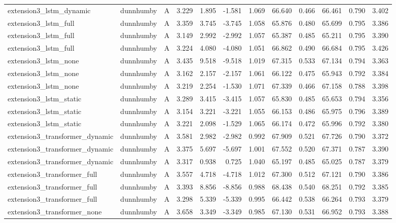 \begin{table}
\begin{tabular}{lllrrrrrrrrr}
extension3_lstm_dynamic & dunnhumby & A & 3.229 & 1.895 & -1.581 & 1.069 & 66.640 & 0.466 & 66.461 & 0.790 & 3.402 \\
extension3_lstm_full & dunnhumby & A & 3.359 & 3.745 & -3.745 & 1.058 & 65.876 & 0.480 & 65.699 & 0.795 & 3.386 \\
extension3_lstm_full & dunnhumby & A & 3.149 & 2.992 & -2.992 & 1.057 & 65.387 & 0.485 & 65.211 & 0.795 & 3.390 \\
extension3_lstm_full & dunnhumby & A & 3.224 & 4.080 & -4.080 & 1.051 & 66.862 & 0.490 & 66.684 & 0.795 & 3.426 \\
extension3_lstm_none & dunnhumby & A & 3.435 & 9.518 & -9.518 & 1.019 & 67.315 & 0.533 & 67.134 & 0.794 & 3.363 \\
extension3_lstm_none & dunnhumby & A & 3.162 & 2.157 & -2.157 & 1.061 & 66.122 & 0.475 & 65.943 & 0.792 & 3.384 \\
extension3_lstm_none & dunnhumby & A & 3.219 & 2.254 & -1.530 & 1.071 & 67.339 & 0.466 & 67.158 & 0.788 & 3.398 \\
extension3_lstm_static & dunnhumby & A & 3.289 & 3.415 & -3.415 & 1.057 & 65.830 & 0.485 & 65.653 & 0.794 & 3.356 \\
extension3_lstm_static & dunnhumby & A & 3.154 & 3.221 & -3.221 & 1.055 & 66.153 & 0.486 & 65.975 & 0.796 & 3.389 \\
extension3_lstm_static & dunnhumby & A & 3.221 & 2.098 & -1.529 & 1.065 & 66.174 & 0.472 & 65.996 & 0.792 & 3.380 \\
extension3_transformer_dynamic & dunnhumby & A & 3.581 & 2.982 & -2.982 & 0.992 & 67.909 & 0.521 & 67.726 & 0.790 & 3.372 \\
extension3_transformer_dynamic & dunnhumby & A & 3.375 & 5.697 & -5.697 & 1.001 & 67.552 & 0.520 & 67.371 & 0.787 & 3.390 \\
extension3_transformer_dynamic & dunnhumby & A & 3.317 & 0.938 & 0.725 & 1.040 & 65.197 & 0.485 & 65.025 & 0.787 & 3.379 \\
extension3_transformer_full & dunnhumby & A & 3.557 & 4.718 & -4.718 & 1.012 & 67.300 & 0.512 & 67.121 & 0.790 & 3.386 \\
extension3_transformer_full & dunnhumby & A & 3.393 & 8.856 & -8.856 & 0.988 & 68.438 & 0.540 & 68.251 & 0.792 & 3.385 \\
extension3_transformer_full & dunnhumby & A & 3.298 & 5.339 & -5.339 & 0.995 & 66.442 & 0.538 & 66.264 & 0.793 & 3.379 \\
extension3_transformer_none & dunnhumby & A & 3.658 & 3.349 & -3.349 & 0.985 & 67.130 & 0.531 & 66.952 & 0.793 & 3.388 \\

\end{tabular}
\end{table}
